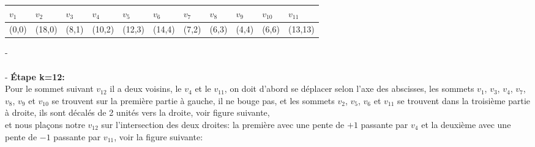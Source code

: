 \documentclass[hidelinks,letterpaper,12pt]{article}
\begin{document}
\begin{tabularx}{\textwidth}{|*{11}{X|}}
\hline
$v_1$ & $v_2$  & $v_3$ & $v_4$  & $v_5$  & $v_6$  & $v_7$ & $v_8$ & $v_9$ & $v_{10}$ & $v_{11}$ \\
\hline
(0,0) & (18,0) & (8,1) & (10,2) & (12,3) & (14,4) & (7,2) & (6,3) & (4,4) & (6,6)    & (13,13) \\
\hline
\end{tabularx}
{\color{white}-}
\\ \\
{\color{white}-}
\textbf{Étape k=12:}
\\
Pour le sommet suivant $v_{12}$ il a deux voisins, le $v_4$ et le $v_{11}$,
on doit d'abord se déplacer selon l'axe des abscisses, 
les sommets $v_1$, $v_3$, $v_4$, $v_7$, $v_8$, $v_9$ et $v_{10}$ se trouvent sur la première partie à gauche, il ne bouge pas, 	
et les sommets $v_2$, $v_5$, $v_6$ et $v_{11}$ se trouvent dans la troisième partie à droite, ils sont décalés de 2 unités vers la droite, voir figure suivante, \\
et nous plaçons notre $v_{12}$ sur l'intersection des deux droites: la première avec une pente de $+1$ passante par $v_4$ et la deuxième avec une pente de $-1$ passante par $v_{11}$, voir la figure suivante:
\end{document}
